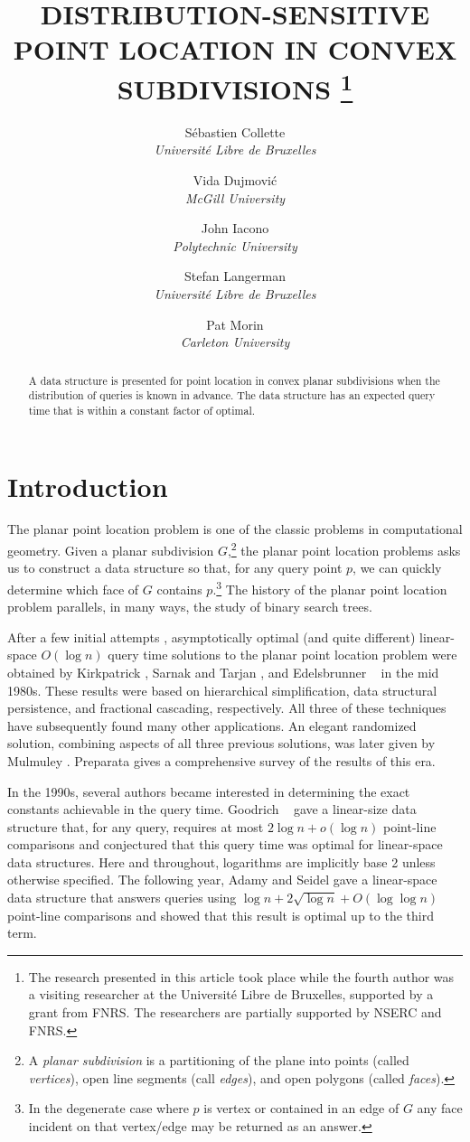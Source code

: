 \documentclass[charterfonts,lotsofwhite]{patmorin}
\title{\MakeUppercase{Distribution-Sensitive Point 
	Location in Convex Subdivisions}%
	\thanks{The research presented in this article took place
while the fourth author was a visiting researcher at the Universit\'e Libre de
Bruxelles, supported by a grant from FNRS.  The researchers are
partially supported by NSERC and FNRS.}}
\author{S\'ebastien Collette \\ \textit{Universit\'e Libre de Bruxelles}
  \and Vida Dujmovi\'c \\ \textit{McGill University}
  \and John Iacono \\ \textit{Polytechnic University}
  \and Stefan Langerman \\ \textit{Universit\'e Libre de Bruxelles}
  \and Pat Morin \\ \textit{Carleton University}}
\date{}
\begin{document}
\maketitle

\begin{abstract}
A data structure is presented for point location in convex planar
subdivisions when the distribution of queries is known in advance.
The data structure has an expected query time that is within a
constant factor of optimal.
\end{abstract}


\section{Introduction}

The planar point location problem is one of the classic problems in
computational geometry. Given a planar subdivision $G$,\footnote{A
\emph{planar subdivision} is a partitioning of the plane into points
(called \emph{vertices}), open line segments (call \emph{edges}), and
open polygons (called \emph{faces}).} the planar point location
problems asks us to construct a data structure so that, for any query
point $p$, we can quickly determine which face of $G$ contains
$p$.\footnote{In the degenerate case where $p$ is vertex or contained
in an edge of $G$ any face incident on that vertex/edge may be
returned as an answer.} The history of the planar point location
problem parallels, in many ways, the study of binary search trees.

After a few initial attempts \cite{dl76,lp77,p81}, asymptotically
optimal (and quite different) linear-space $O(\log n)$ query time
solutions to the planar point location problem were obtained by
Kirkpatrick \cite{k83}, Sarnak and Tarjan \cite{st86}, and
Edelsbrunner \etal\ \cite{egs86} in the mid 1980s.  These results were
based on hierarchical simplification, data structural persistence, and
fractional cascading, respectively.  All three of these techniques have
subsequently found many other applications.  An elegant randomized
solution, combining aspects of all three previous solutions, was later
given by Mulmuley \cite{m90}.  Preparata \cite{p90} gives a
comprehensive survey of the results of this era.

In the 1990s, several authors became interested in determining the
exact constants achievable in the query time.  Goodrich \etal\
\cite{gor97} gave a linear-size data structure that, for any query,
requires at most $2\log n + o(\log n)$ point-line comparisons and
conjectured that this query time was optimal for linear-space data
structures. Here and throughout, logarithms are implicitly base 2
unless otherwise specified. The following year, Adamy and Seidel
\cite{as98} gave a linear-space data structure that answers queries
using $\log n + 2\sqrt{\log n} + O(\log\log n)$ point-line comparisons
and showed that this result is optimal up to the third term.
\end{document}
